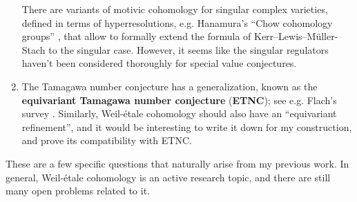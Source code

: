 \documentclass{article}
\begin{document}
\begin{enumerate}
  There are variants of motivic cohomology for singular complex varieties,
  defined in terms of hyperresolutions, e.g. Hanamura's
  ``Chow cohomology groups'' \cite{Hanamura-2000}, that allow to formally extend
  the formula of Kerr--Lewis--Müller-Stach to the singular case. However,
  it seems like the singular regulators haven't been considered thoroughly for
  special value conjectures.

\item The Tamagawa number conjecture has a generalization, known as the
  \textbf{equivariant Tamagawa number conjecture} (\textbf{ETNC});
  see e.g. Flach's survey \cite{Flach-ETNC}. Similarly, Weil-étale cohomology
  should also have an ``equivariant refinement'', and it would be interesting to
  write it down for my construction, and prove its compatibility with ETNC.
\end{enumerate}

These are a few specific questions that naturally arise from my previous
work. In general, Weil-étale cohomology is an active research topic, and there
are still many open problems related to it.

\pagebreak



\end{document}
